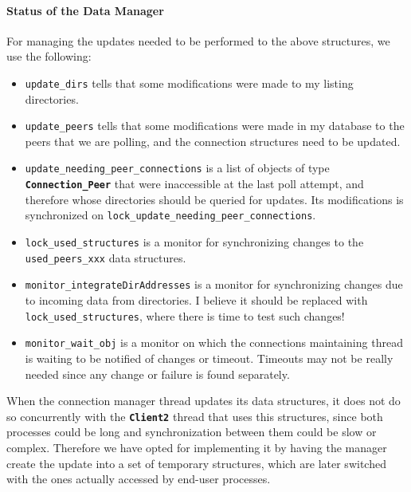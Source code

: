 \documentclass{book}
\newcommand{\cls}[1]{{\tt\bf #1}}
\newcommand{\mmb}[1]{{\tt #1}}
\begin{document}
\paragraph{Status of the Data Manager}
For managing the updates needed to be performed to the above structures, we use the following:
\begin{itemize}
\item
\mmb{update\_dirs} tells that some modifications were made to my listing directories.
\item
\mmb{update\_peers} tells that some modifications were made in my database to the peers that we are polling, and the connection
structures need to be updated.
\item
\mmb{update\_needing\_peer\_connections} is a list of objects of type \cls{Connection\_Peer} that were inaccessible at the last
poll attempt, and therefore whose directories should be queried for updates. Its modifications is synchronized on
\mmb{lock\_update\_needing\_peer\_connections}.
\item
\mmb{lock\_used\_structures} is a monitor for synchronizing changes to the \mmb{used\_peers\_xxx} data structures.
\item
\mmb{monitor\_integrateDirAddresses} is a monitor for synchronizing changes due to incoming data from directories. I believe it
should be replaced with \mmb{lock\_used\_structures}, where there is time to test such changes!
\item
\mmb{monitor\_wait\_obj} is a monitor on which the connections maintaining thread is waiting to be notified of changes or timeout.
Timeouts may not be really needed since any change or failure is found separately.
\end{itemize}


When the connection manager thread updates its data structures, it does not do so concurrently with the \cls{Client2} thread
that uses this structures, since both processes could be long and synchronization between them could be slow or complex.
Therefore we have opted for implementing it by having the manager create the update into a set of temporary structures,
which are later switched with the ones actually accessed by end-user processes.
\end{document}
